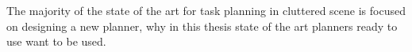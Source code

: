 
The majority of the state of the art for task planning in cluttered scene is focused on designing a new planner, why in this thesis state of the art planners ready to use want to be used. 

